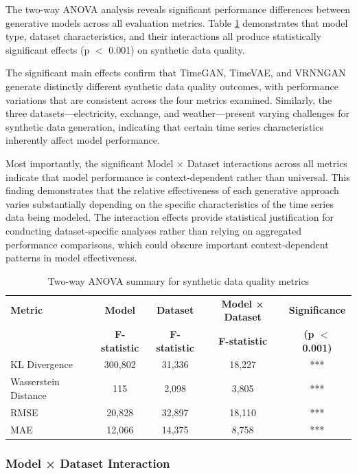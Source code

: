 \documentclass{article}
\begin{document}
The two-way ANOVA analysis reveals significant performance differences between generative models across all evaluation metrics. Table \ref{tab:anova_summary} demonstrates that model type, dataset characteristics, and their interactions all produce statistically significant effects (p $<$ 0.001) on synthetic data quality.

The significant main effects confirm that TimeGAN, TimeVAE, and VRNNGAN generate distinctly different synthetic data quality outcomes, with performance variations that are consistent across the four metrics examined. Similarly, the three datasets—electricity, exchange, and weather—present varying challenges for synthetic data generation, indicating that certain time series characteristics inherently affect model performance.

Most importantly, the significant Model × Dataset interactions across all metrics indicate that model performance is context-dependent rather than universal. This finding demonstrates that the relative effectiveness of each generative approach varies substantially depending on the specific characteristics of the time series data being modeled. The interaction effects provide statistical justification for conducting dataset-specific analyses rather than relying on aggregated performance comparisons, which could obscure important context-dependent patterns in model effectiveness.

\begin{table}[H]
\centering
\caption{Two-way ANOVA summary for synthetic data quality metrics}
\label{tab:anova_summary}
\begin{tabular}{lcccc}
\toprule
\textbf{Metric} & \textbf{Model} & \textbf{Dataset} & \textbf{Model × Dataset} & \textbf{Significance} \\
 & \textbf{F-statistic} & \textbf{F-statistic} & \textbf{F-statistic} & \textbf{(p $<$ 0.001)} \\
\midrule
KL Divergence & 300,802 & 31,336 & 18,227 & *** \\
Wasserstein Distance & 115 & 2,098 & 3,805 & *** \\
RMSE & 20,828 & 32,897 & 18,110 & *** \\
MAE & 12,066 & 14,375 & 8,758 & *** \\
\bottomrule
\end{tabular}
\end{table}



\subsubsection{Model × Dataset Interaction}
\end{document}
